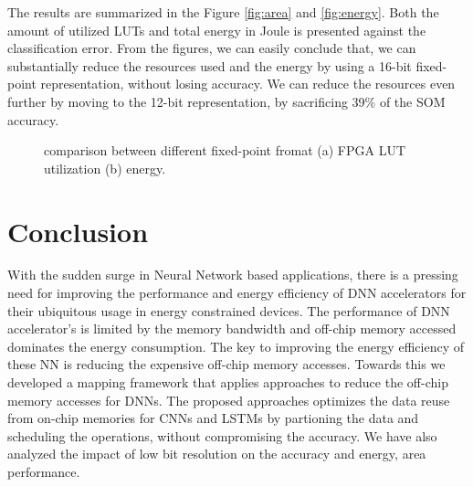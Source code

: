 \documentclass[a4paper,10pt]{article}
\begin{document}
The results are summarized in the Figure \ref{fig:area} and \ref{fig:energy}. Both the amount of utilized LUTs and total energy in Joule is presented against the classification error. From the figures, we can easily conclude that, we can substantially reduce the resources used and the energy by using a 16-bit fixed-point representation, without losing accuracy. We can reduce the resources even further by moving to the 12-bit representation, by sacrificing 39\% of the SOM accuracy. 
\begin{figure}[htb]
	\centering
	\hfil
	\caption{comparison between different fixed-point fromat (a) FPGA LUT utilization (b) energy.}
	\label{fig:metrics}
\end{figure}
\section{Conclusion}
With the sudden surge in Neural Network based applications, there is a pressing need for improving the performance and energy efficiency of DNN accelerators for their ubiquitous usage in energy constrained devices. The performance of DNN accelerator's is limited by the memory bandwidth and off-chip memory accessed dominates the energy consumption. The key to improving the energy efficiency of these NN is reducing the expensive off-chip memory accesses. Towards this we developed a mapping framework that applies approaches to reduce the off-chip memory accesses for DNNs. The proposed approaches optimizes the data reuse from on-chip memories for CNNs and LSTMs by partioning the data and scheduling the operations, without compromising the accuracy. We have also analyzed the impact of low bit resolution on the accuracy and energy, area performance. 
\footnotesize

\end{document}
